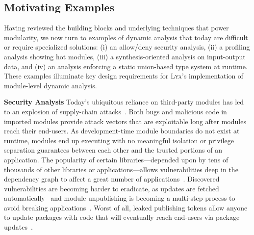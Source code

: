 \documentclass[letterpaper,twocolumn,10pt]{article}
\def\omit#1{}
\newcommand{\heading}[1]{\vspace{2pt}\noindent\textbf{#1}\enspace}
\newcommand{\sys}{{\scshape Lya}\xspace}
\begin{document}
\subsection{Motivating Examples}

Having reviewed the building blocks and underlying techniques that power modularity, we now turn to examples of dynamic analysis that today are difficult or require specialized solutions:
  (i) an allow/deny security analysis,
  (ii) a profiling analysis showing hot modules,
  (iii) a synthesis-oriented analysis on input-output data, and
  (iv) an analysis enforcing a static union-based type system at runtime.
These examples illuminate key design requirements for \sys's implementation of module-level dynamic analysis.

\heading{Security Analysis}
Today's ubiquitous reliance on third-party modules has led to an explosion of supply-chain attacks~\cite{maass2016theory, lauinger2017thou, long2015owasp, cadariu2015tracking, breakapp:plos:2017, snyk}.
Both bugs and malicious code in imported modules provide attack vectors that are exploitable long after modules reach their end-users.
As development-time module boundaries do not exist at runtime, modules end up executing with no meaningful isolation or privilege separation guarantees between each other and the trusted portions of an application.
The popularity of certain libraries---depended upon by tens of thousands of other libraries or applications---allows vulnerabilities deep in the dependency graph to affect a great number of applications~\cite{kuppusamy2016diplomat, leftpad, npmstudy:19}.
Discovered vulnerabilities are becoming harder to eradicate, as updates are fetched automatically~\cite{npmFailure} and module unpublishing is becoming a multi-step process to avoid breaking applications~\cite{npmUnpublish}.
Worst of all,\omit{package developers accidentally publishing their security} leaked publishing tokens allow anyone to update packages with code that will eventually reach end-users via package updates~\cite{eslint1, eslint2}.
\end{document}
